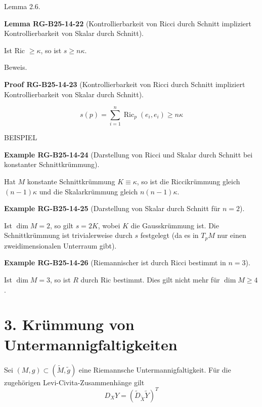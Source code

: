 \documentclass[10pt, letterpaper]{article}
\newcommand{\CustomHeading}[3]{%
  \par\medskip\noindent%
  \textbf{#1 #2} \textnormal{(#3)}.\enskip%
}
\newenvironment{LEM}[2]{\begin{unitbox}\CustomHeading{Lemma}{#1}{#2}}{\end{unitbox}}
\newenvironment{EXA}[2]{\begin{unitbox}\CustomHeading{Example}{#1}{#2}}{\end{unitbox}}
\newenvironment{PROOF}[2]{\begin{unitbox}\CustomHeading{Proof}{#1}{#2}}{\end{unitbox}}
\begin{document}
Lemma 2.6. 


\begin{LEM}{RG-B25-14-22}{Kontrollierbarkeit von Ricci durch Schnitt impliziert Kontrollierbarkeit von Skalar durch Schnitt}
Ist Ric $\geq \kappa$, so ist $s \geq n \kappa$.
\end{LEM}


Beweis.

\begin{PROOF}{RG-B25-14-23}{Kontrollierbarkeit von Ricci durch Schnitt impliziert Kontrollierbarkeit von Skalar durch Schnitt}
$$
s(p)=\sum_{i=1}^{n} \operatorname{Ric}_{p}\left(e_{i}, e_{i}\right) \geq n \kappa
$$
\end{PROOF}



BEISPIEL


\begin{EXA}{RG-B25-14-24}{Darstellung von Ricci und Skalar durch Schnitt bei konstanter Schnittkrümmung}
Hat $M$ konstante Schnittkrümmung $K \equiv \kappa$, so ist die Riccikrümmung gleich $(n-1) \kappa$ und die Skalarkrümmung gleich $n(n-1) \kappa$.
\end{EXA}



\begin{EXA}{RG-B25-14-25}{Darstellung von Skalar durch Schnitt für $n=2$}
Ist $\operatorname{dim} M=2$, so gilt $s=2 K$, wobei $K$ die Gausskrümmung ist. Die Schnittkrümmung ist trivialerweise durch $s$ festgelegt (da es in $T_{p} M$ nur einen zweidimensionalen Unterraum gibt).
\end{EXA}


\begin{EXA}{RG-B25-14-26}{Riemannischer ist durch Ricci bestimmt in $n=3$}
Ist $\operatorname{dim} M=3$, so ist $R$ durch Ric bestimmt. Dies gilt nicht mehr für $\operatorname{dim} M \geq 4$.
\end{EXA}



\pagebreak



\section*{3. Krümmung von Untermannigfaltigkeiten}



Sei $(M, g) \subset(\tilde{M}, \tilde{g})$ eine Riemannsche Untermannigfaltigkeit. Für die zugehörigen Levi-Civita-Zusammenhänge gilt
$$
D_{X} Y=\left(\tilde{D}_{\tilde{X}} \tilde{Y}\right)^{T}
$$
\end{document}
